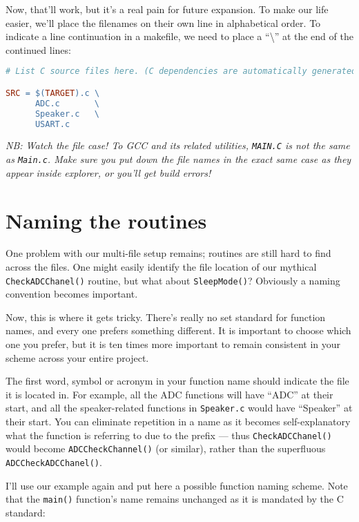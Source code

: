 \documentclass[a4paper,oneside]{book}
\begin{document}
Now, that'll work, but it's a real pain for future expansion. To make our life easier, we'll place the filenames on their own line in alphabetical order. To indicate a line continuation in a makefile, we need to place a ``\textbackslash'' at the end of the continued lines:

\begin{center}
\begin{lstlisting}[language=make]
# List C source files here. (C dependencies are automatically generated.)

SRC = $(TARGET).c \
      ADC.c       \
      Speaker.c   \
      USART.c
\end{lstlisting}
\end{center}

\textit{NB: Watch the file case! To GCC and its related utilities, \texttt{MAIN.C} is not the same as \texttt{Main.c}. Make sure you put down the file names in the exact same case as they appear inside explorer, or you'll get build errors!}

\section{Naming the routines}

One problem with our multi-file setup remains; routines are still hard to find across the files. One might easily identify the file location of our mythical \texttt{CheckADCChanel()} routine, but what about \texttt{SleepMode()}? Obviously a naming convention becomes important.

Now, this is where it gets tricky. There's really no set standard for function names, and every one prefers something different. It is important to choose which one you prefer, but it is ten times more important to remain consistent in your scheme across your entire project.

The first word, symbol or acronym in your function name should indicate the file it is located in. For example, all the ADC functions will have ``ADC'' at their start, and all the speaker-related functions in \texttt{Speaker.c} would have ``Speaker'' at their start. You can eliminate repetition in a name as it becomes self-explanatory what the function is referring to due to the prefix --- thus \texttt{CheckADCChanel()} would become \texttt{ADCCheckChannel()} (or similar), rather than the superfluous \texttt{ADCCheckADCChanel()}.

I'll use our example again and put here a possible function naming scheme. Note that the \texttt{main()} function's name remains unchanged as it is mandated by the C standard:
\end{document}
